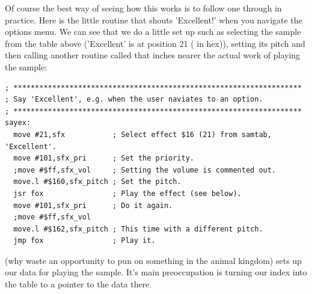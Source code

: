 Of course the best way of seeing how this works is to follow one through in practice. Here
is the little routine that shouts 'Excellent!' when you navigate the options menu. We can
see that we do a little set up such as selecting the sample from the table above ('Excellent'
is at position 21 ( in hex)), setting its pitch and then calling another routine
called  that inches nearer the actual work of playing the sample:

\begin{lstlisting}
; *******************************************************************
; Say 'Excellent', e.g. when the user naviates to an option.
; *******************************************************************
sayex:
  move #21,sfx           ; Select effect $16 (21) from samtab, 'Excellent'.
  move #101,sfx_pri      ; Set the priority.
  ;move #$ff,sfx_vol     ; Setting the volume is commented out.
  move.l #$160,sfx_pitch ; Set the pitch.
  jsr fox                ; Play the effect (see below).
  move #101,sfx_pri      ; Do it again.
  ;move #$ff,sfx_vol
  move.l #$162,sfx_pitch ; This time with a different pitch.
  jmp fox                ; Play it.
\end{lstlisting}

 (why waste an opportunity to pun on  something in the animal kingdom) sets
up our data for playing the sample. It's main preoccupation is turning our index into
the  table to a pointer to the data there.

